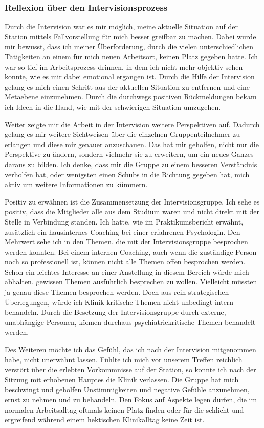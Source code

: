 \subsubsection{Reflexion über den Intervisionsprozess}
Durch die Intervision war es mir möglich, meine aktuelle Situation auf der Station mittels Fallvorstellung für mich besser greifbar zu machen. Dabei wurde mir bewusst, dass ich meiner Überforderung, durch die vielen unterschiedlichen Tätigkeiten an einem für mich neuen Arbeitsort, keinen Platz gegeben hatte. Ich war so tief im Arbeitsprozess drinnen, in dem ich nicht mehr objektiv sehen konnte, wie es mir dabei emotional ergangen ist. Durch die Hilfe der Intervision gelang es mich einen Schritt aus der aktuellen Situation zu entfernen und eine Metaebene einzunehmen. Durch die durchwegs positiven Rückmeldungen bekam ich Ideen in die Hand, wie mit der schwierigen Situation umzugehen. 

Weiter zeigte mir die Arbeit in der Intervision weitere Perspektiven auf. Dadurch gelang es mir weitere Sichtweisen über die einzelnen Gruppenteilnehmer zu erlangen und diese mir genauer anzuschauen. Das hat mir geholfen, nicht nur die Perspektive zu ändern, sondern vielmehr sie zu erweitern, um ein neues Ganzes daraus zu bilden. Ich denke, dass mir die Gruppe zu einem besseren Verständnis verholfen hat, oder wenigsten einen Schubs in die Richtung gegeben hat, mich aktiv um weitere Informationen zu kümmern.

Positiv zu erwähnen ist die Zusammensetzung der Intervisionsgruppe. Ich sehe es positiv, dass die Mitglieder alle aus dem Studium waren und nicht direkt mit der Stelle in Verbindung standen. Ich hatte, wie im Praktikumsbericht erwähnt, zusätzlich ein hausinternes Coaching bei einer erfahrenen Psychologin. Den Mehrwert sehe ich in den Themen, die mit der Intervisionsgruppe besprochen werden konnten. Bei einem internen Coaching, auch wenn die zuständige Person noch so professionell ist, können nicht alle Themen offen besprochen werden. Schon ein leichtes Interesse an einer Anstellung in diesem Bereich würde mich abhalten, gewissen Themen ausführlich besprechen zu wollen. Vielleicht müssten ja genau diese Themen besprochen werden. Doch aus rein strategischen Überlegungen, würde ich Klinik kritische Themen nicht unbedingt intern behandeln. Durch die Besetzung der Intervisionsgruppe durch externe, unabhängige Personen, können durchaus psychiatriekritische Themen behandelt werden.

Des Weiteren möchte ich das Gefühl, das ich nach der Intervision mitgenommen habe, nicht unerwähnt lassen. Fühlte ich mich vor unserem Treffen reichlich verstört über die erlebten Vorkommnisse auf der Station, so konnte ich nach der Sitzung mit erhobenen Hauptes die Klinik verlassen. Die Gruppe hat mich beschwingt und geholfen Unstimmigkeiten und negative Gefühle anzunehmen, ernst zu nehmen und zu behandeln. Den Fokus auf Aspekte legen dürfen, die im normalen Arbeitsalltag oftmals keinen Platz finden oder für die schlicht und ergreifend während einem hektischen Klinikalltag keine Zeit ist. 

